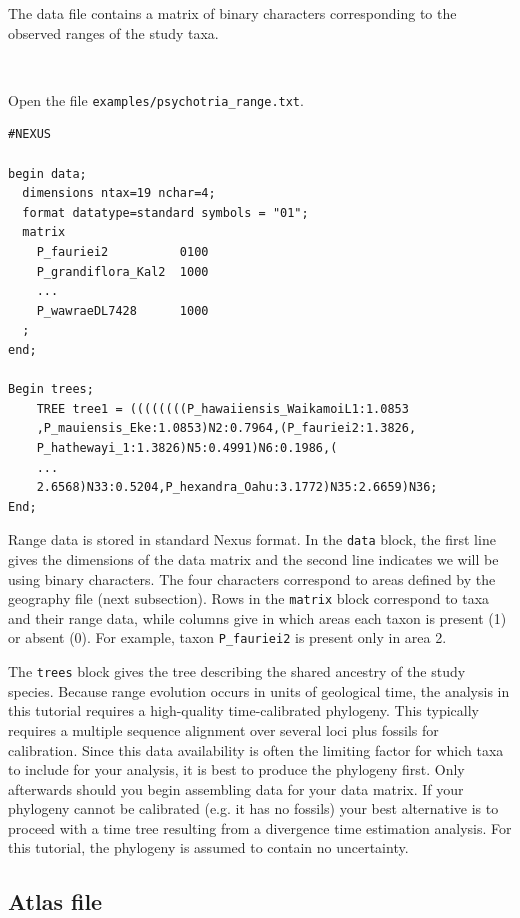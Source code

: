 \documentclass[11pt]{article}
\newcommand{\impmark}{\strut\vadjust{\domark}}
\newcommand{\domark}{%
  \vbox to 0pt{
    \kern-\dp\strutbox
    \smash{\llap{$\rightarrow$\kern1em}}
    \vss
  }%
}
\begin{document}
The data file contains a matrix of binary characters corresponding to the observed ranges of the study taxa.

\noindent \\ \impmark  Open the file \texttt{examples/psychotria\_range.txt}.

\begin{framed}
\begin{lstlisting}
#NEXUS

begin data;
  dimensions ntax=19 nchar=4;
  format datatype=standard symbols = "01";
  matrix
    P_fauriei2          0100
    P_grandiflora_Kal2  1000
    ...
    P_wawraeDL7428      1000	
  ;
end;

Begin trees;
	TREE tree1 = ((((((((P_hawaiiensis_WaikamoiL1:1.0853
	,P_mauiensis_Eke:1.0853)N2:0.7964,(P_fauriei2:1.3826,
	P_hathewayi_1:1.3826)N5:0.4991)N6:0.1986,(
	...
	2.6568)N33:0.5204,P_hexandra_Oahu:3.1772)N35:2.6659)N36;
End;
\end{lstlisting}
\end{framed}

Range data is stored in standard Nexus format.
In the {\tt data} block, the first line gives the dimensions of the data matrix and the second line indicates we will be using binary characters.
The four characters correspond to areas defined by the geography file (next subsection).
Rows in the {\tt matrix} block correspond to taxa and their range data, while columns give in which areas each taxon is present (1) or absent (0).
For example, taxon {\tt P\_fauriei2} is present only in area 2.

The {\tt trees} block gives the tree describing the shared ancestry of the study species.
Because range evolution occurs in units of geological time, the analysis in this tutorial requires a high-quality time-calibrated phylogeny.
This typically requires a multiple sequence alignment over several loci plus fossils for calibration.
Since this data availability is often the limiting factor for which taxa to include for your analysis, it is best to produce the phylogeny first.
Only afterwards should you begin assembling data for your data matrix.
If your phylogeny cannot be calibrated (e.g. it has no fossils) your best alternative is to proceed with a time tree resulting from a divergence time estimation analysis.
For this tutorial, the phylogeny is assumed to contain no uncertainty.

\subsection{Atlas file}
\end{document}
